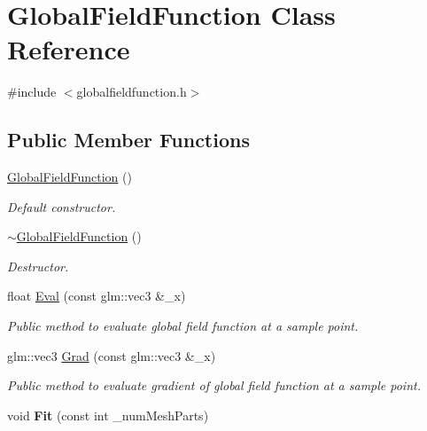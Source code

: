 \hypertarget{classGlobalFieldFunction}{}\section{Global\+Field\+Function Class Reference}
\label{classGlobalFieldFunction}


{\ttfamily \#include $<$globalfieldfunction.\+h$>$}

\subsection*{Public Member Functions}
\begin{DoxyCompactItemize}
\item 
\hyperlink{classGlobalFieldFunction_a0271c773597d0f768efaf377bd0fe38b}{Global\+Field\+Function} ()\hypertarget{classGlobalFieldFunction_a0271c773597d0f768efaf377bd0fe38b}{}\label{classGlobalFieldFunction_a0271c773597d0f768efaf377bd0fe38b}

\begin{DoxyCompactList}\small\item\em Default constructor. \end{DoxyCompactList}\item 
\hyperlink{classGlobalFieldFunction_adfe8046eb7a49ca76d50ce461b8fccde}{$\sim$\+Global\+Field\+Function} ()\hypertarget{classGlobalFieldFunction_adfe8046eb7a49ca76d50ce461b8fccde}{}\label{classGlobalFieldFunction_adfe8046eb7a49ca76d50ce461b8fccde}

\begin{DoxyCompactList}\small\item\em Destructor. \end{DoxyCompactList}\item 
float \hyperlink{classGlobalFieldFunction_a9226a98fa5f63736dae4155d99dec240}{Eval} (const glm\+::vec3 \&\+\_\+x)
\begin{DoxyCompactList}\small\item\em Public method to evaluate global field function at a sample point. \end{DoxyCompactList}\item 
glm\+::vec3 \hyperlink{classGlobalFieldFunction_a49bffb060b34cb87706aa0fc3884174a}{Grad} (const glm\+::vec3 \&\+\_\+x)
\begin{DoxyCompactList}\small\item\em Public method to evaluate gradient of global field function at a sample point. \end{DoxyCompactList}\item 
void {\bfseries Fit} (const int \+\_\+num\+Mesh\+Parts)\hypertarget{classGlobalFieldFunction_ad243a639230c57d507710c117751f5ab}{}\label{classGlobalFieldFunction_ad243a639230c57d507710c117751f5ab}


\end{DoxyCompactItemize}
